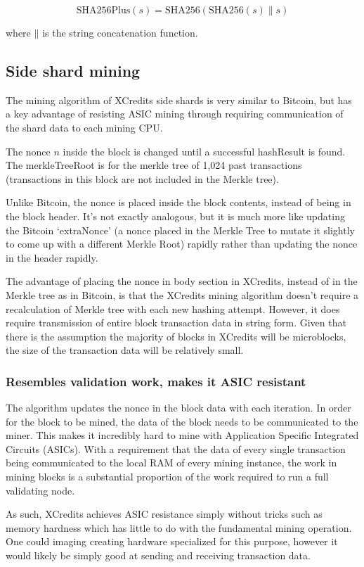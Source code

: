 \documentclass[a4paper,12pt]{article}
\newcommand{\concatenate}{\mathbin{\|}}
\begin{document}
\[ \text{SHA256Plus}(s) = \text{SHA256}(\text{SHA256}(s) \concatenate s)\]
 
where $\concatenate$ is the string concatenation function. 
  


\subsection{Side shard mining}
The mining algorithm of XCredits side shards is very similar to Bitcoin, but has a key advantage of resisting ASIC mining through requiring communication of the shard data to each mining CPU. 

The nonce $n$ inside the block is changed until a successful hashResult is found. The merkleTreeRoot is for the merkle tree of 1,024 past transactions (transactions in this block are not included in the Merkle tree).

Unlike Bitcoin, the nonce is placed inside the block contents, instead of being in the block header. It's not exactly analogous, but it is much more like updating the Bitcoin `extraNonce' (a nonce placed in the Merkle Tree to mutate it slightly to come up with a different Merkle Root) rapidly rather than updating the nonce in the header rapidly.

The advantage of placing the nonce in body section in XCredits, instead of in the Merkle tree as in Bitcoin, is that the XCredits mining algorithm doesn't require a recalculation of Merkle tree with each new hashing attempt. However, it does require transmission of entire block transaction data in string form. Given that there is the assumption the majority of blocks in XCredits will be microblocks, the size of the transaction data will be relatively small.


\subsubsection{Resembles validation work, makes it ASIC resistant}
The algorithm updates the nonce in the block data with each iteration. In order for the block to be mined, the data of the block needs to be communicated to the miner. This makes it incredibly hard to mine with Application Specific Integrated Circuits (ASICs).  With a requirement that the data of every single transaction being communicated to the local RAM of every mining instance, the work in mining blocks is a substantial proportion of the work required to run a full validating node.

As such, XCredits achieves ASIC resistance simply without tricks such as memory hardness which has little to do with the fundamental mining operation. One could imaging creating hardware specialized for this purpose, however it would likely be simply good at sending and receiving transaction data.
\end{document}
